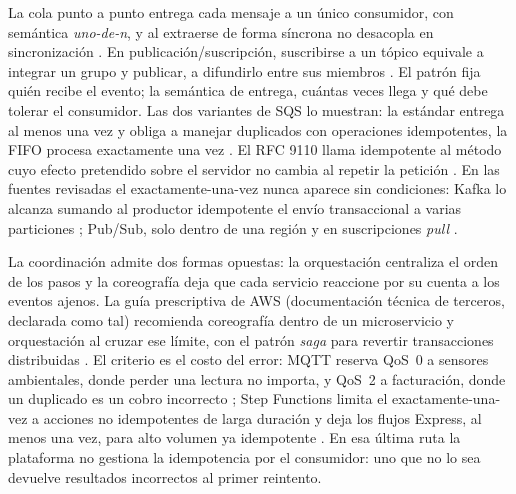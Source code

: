 \documentclass[12pt, letterpaper, table, xcdraw]{inf-pucv}
\begin{document}
La cola punto a punto entrega cada mensaje a un único consumidor, con semántica
\emph{uno-de-n}, y al extraerse de forma síncrona no desacopla en sincronización
\parencite{eugster2003}. En publicación/suscripción, suscribirse a un tópico
equivale a integrar un grupo y publicar, a difundirlo entre sus miembros
\parencite{eugster2003}. El patrón fija quién recibe el evento; la semántica de
entrega, cuántas veces llega y qué debe tolerar el consumidor. Las dos variantes
de SQS lo muestran: la estándar entrega al menos una vez y obliga a manejar
duplicados con operaciones idempotentes, la FIFO procesa exactamente una vez
\parencite{awssqsqueuetypes}. El RFC 9110 llama idempotente al método cuyo efecto
pretendido sobre el servidor no cambia al repetir la petición
\parencite{rfc9110}. En las fuentes revisadas el exactamente-una-vez nunca
aparece sin condiciones: Kafka lo alcanza sumando al productor idempotente el
envío transaccional a varias particiones \parencite{kafkadesign}; Pub/Sub, solo
dentro de una región y en suscripciones \emph{pull}
\parencite{gcppubsubexactlyonce}.

La coordinación admite dos formas opuestas: la orquestación centraliza el orden
de los pasos y la coreografía deja que cada servicio reaccione por su cuenta a
los eventos ajenos. La guía prescriptiva de AWS (documentación técnica de
terceros, declarada como tal) recomienda coreografía dentro de un microservicio y
orquestación al cruzar ese límite, con el patrón \emph{saga} para revertir
transacciones distribuidas \parencite{awscoordination}. El criterio es el costo
del error: MQTT reserva QoS~0 a sensores ambientales, donde perder una lectura no
importa, y QoS~2 a facturación, donde un duplicado es un cobro incorrecto
\parencite{mqttv5}; Step Functions limita el exactamente-una-vez a acciones no
idempotentes de larga duración y deja los flujos Express, al menos una vez, para
alto volumen ya idempotente \parencite{awsstepfunctions}. En esa última ruta la
plataforma no gestiona la idempotencia por el consumidor: uno que no lo sea
devuelve resultados incorrectos al primer reintento.

\end{document}
